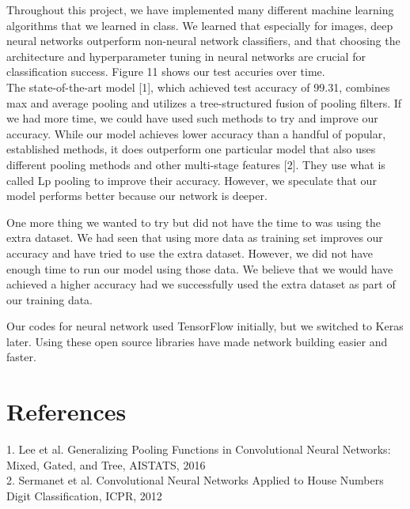 \documentclass[12pt]{article}
\begin{document}
\indent \indent Throughout this project, we have implemented many different machine learning algorithms that we learned in class. We learned that especially for images, deep neural networks outperform non-neural network classifiers, and that choosing the architecture and hyperparameter tuning in neural networks are crucial for classification success. Figure 11 shows our test accuries over time. \\


\indent The state-of-the-art model [1], which achieved test accuracy of 99.31, combines max and average pooling and utilizes a tree-structured fusion of pooling filters. If we had more time, we could have used such methods to try and improve our accuracy. While our model achieves lower accuracy than a handful of popular, established methods, it does outperform one particular model that also uses different pooling methods and other multi-stage features [2]. They use what is called Lp pooling to improve their accuracy. However, we speculate that our model performs better because our network is deeper.

\indent One more thing we wanted to try but did not have the time to was using the extra dataset. We had seen that using more data as training set improves our accuracy and have tried to use the extra dataset. However, we did not have enough time to run our model using those data. We believe that we would have achieved a higher accuracy had we successfully used the extra dataset as part of our training data. 

\indent Our codes for neural network used TensorFlow initially, but we switched to Keras later. Using these open source libraries have made network building easier and faster.

\hrulefill
\section {References}
	1. Lee et al. Generalizing Pooling Functions in Convolutional Neural Networks: Mixed, Gated, and Tree, AISTATS, 2016\\
	2. Sermanet et al. Convolutional Neural Networks Applied to
	House Numbers Digit Classification, ICPR, 2012\\
\end{document}
